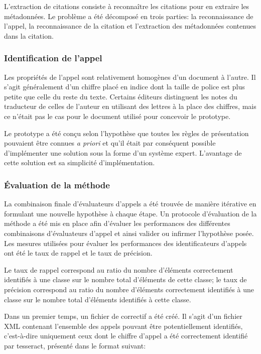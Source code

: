 L'extraction de citations consiste à reconnaître les citations pour en extraire les métadonnées. Le problème a été décomposé en trois parties: la reconnaissance de l'appel, la reconnaissance de la citation et l'extraction des métadonnées contenues dans la citation.

\subsubsection{Identification de l'appel}
Les propriétés de l'appel sont relativement homogènes d'un document à l'autre. Il s'agit généralement d'un chiffre placé en indice dont la taille de police est plus petite que celle du reste du texte. Certains éditeurs distinguent les notes du traducteur de celles de l'auteur en utilisant des lettres à la place des chiffres, mais ce n'était pas le cas pour le document utilisé pour concevoir le prototype.

Le prototype a été conçu selon l'hypothèse que toutes les règles de présentation pouvaient être connues \emph{a priori} et qu'il était par conséquent possible d'implémenter une solution sous la forme d'un système expert. L'avantage de cette solution est sa simplicité d'implémentation.

\subsubsection{Évaluation de la méthode}

La combinaison finale d'évaluateurs d'appels a été trouvée de manière itérative en formulant une nouvelle hypothèse à chaque étape. Un protocole d'évaluation de la méthode a été mis en place afin d'évaluer les performances des différentes combinaisons d'évaluateurs d'appel et ainsi valider ou infirmer l'hypothèse posée. Les mesures utilisées pour évaluer les performances des identificateurs d'appels ont été le taux de rappel et le taux de précision.

Le taux de rappel correspond au ratio du nombre d'éléments correctement identifiés à une classe sur le nombre total d'éléments de cette classe; le taux de précision correspond au ratio du nombre d'éléments correctement identifiés à une classe sur le nombre total d'éléments identifiés à cette classe.

Dans un premier temps, un fichier de correctif a été créé. Il s'agit d'un fichier XML contenant l'ensemble des appels pouvant être potentiellement identifiés, c'est-à-dire uniquement ceux dont le chiffre d'appel a été correctement identifié par tesseract, présenté dans le format suivant:

